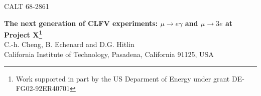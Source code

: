 \documentclass[12pt]{article}
\begin{document}
\hfill CALT 68-2861
\bigskip


\begin{center}
{\Large\bf The next generation of 
CLFV experiments:\break
$\mu \to e \gamma$ and  $\mu \to 3e$ at Project X\footnote{Work supported in part by the US Deparment of Energy under grant DE-FG02-92ER40701}\break\\}
{\large C.-h. Cheng, B. Echenard and D.G. Hitlin\break\\}
\vskip -12pt
{\large California Institute of Technology, Pasadena, California 91125, USA}
\end{center}
\smallskip
\begin{abstract}
We explore the possibilites for extending the sensitivity of current searches for the charged lepton flavor violating decays $\mu\to e \gamma$ and  $\mu\to eee$.  A future facility such as Project X at 
Fermilab could provide a much more intense beam, allowing more sensitive searches, but more
sensitive detectors will be required as well. Current searches are limited by accidental and physics backgrounds, and by the total number of stopped muons. One of the limiting factors in current detectors
for $\mu \to e \gamma$ searches is the photon energy resolution of the calorimeter. We present a study of a
conceptual design of a new detector, using a fast simulation software, that
detects converted $e^+e^-$ pairs from signal photons, taking advantage of the  improved
energy resolution of a pair spectrometer based on asilicon charged particle tracker.  We also study
a related detector design for a next generation $\mu\to eee$ search experiment.
\end{abstract}








\end{document}
